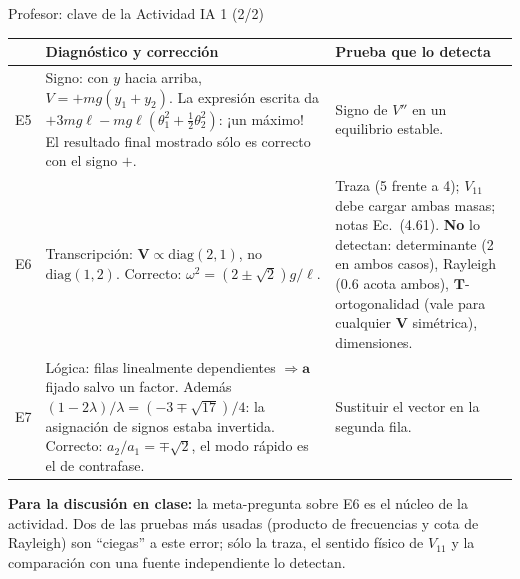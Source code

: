 \documentclass[spanish]{beamer}
\newcommand{\Tm}{\mathbf{T}}              %
\newcommand{\Vm}{\mathbf{V}}              %
\newcommand{\ba}{\boldsymbol{a}}          %
\begin{document}
\begin{frame}{Profesor: clave de la Actividad IA 1 (2/2)}
\scriptsize
\begin{tabular}{@{}L{0.05\textwidth}L{0.54\textwidth}L{0.33\textwidth}@{}}
\toprule
& \textbf{Diagnóstico y corrección} & \textbf{Prueba que lo detecta}\\
\midrule
E5 & Signo: con $y$ hacia arriba, $V=+mg(y_1+y_2)$. La expresión escrita da $+3mg\ell-mg\ell(\theta_1^2+\tfrac12\theta_2^2)$: ¡un máximo! El resultado final mostrado sólo es correcto con el signo $+$. & Signo de $V''$ en un equilibrio estable. \\
E6 & Transcripción: $\Vm\propto\mathrm{diag}(2,1)$, no $\mathrm{diag}(1,2)$. Correcto: $\omega^2=(2\pm\sqrt2)g/\ell$. & Traza (5 frente a 4); $V_{11}$ debe cargar ambas masas; notas Ec.~(4.61). \textbf{No} lo detectan: determinante (2 en ambos casos), Rayleigh ($0.6$ acota ambos), $\Tm$-ortogonalidad (vale para cualquier $\Vm$ simétrica), dimensiones. \\
E7 & Lógica: filas linealmente dependientes $\Rightarrow\ba$ fijado salvo un factor. Además $(1-2\lambda)/\lambda=(-3\mp\sqrt{17})/4$: la asignación de signos estaba invertida. Correcto: $a_2/a_1=\mp\sqrt2$, el modo rápido es el de contrafase. & Sustituir el vector en la segunda fila. \\
\bottomrule
\end{tabular}

\medskip
\textbf{Para la discusión en clase:} la meta-pregunta sobre E6 es el núcleo de la actividad. Dos de las pruebas más usadas (producto de frecuencias y cota de Rayleigh) son ``ciegas'' a este error; sólo la traza, el sentido físico de $V_{11}$ y la comparación con una fuente independiente lo detectan.
\end{frame}
\end{document}
